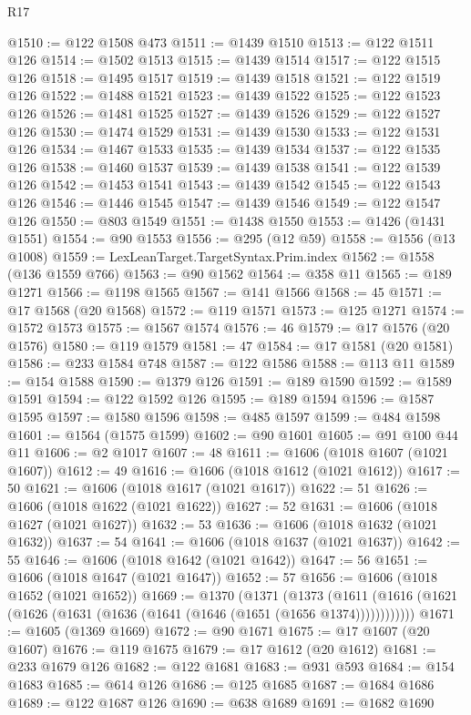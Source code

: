\begin{lexlean}{R17}
\begin{coremodule}
{{{{{{{{{{{{{{{{{{{{{{{{{{{{{{{{{{{{{{{{{{{{{{{{{{{{{{{{{{{{{{{{{{{{{{{{{{{{{{{{{{{{{{{{{{{{{{{{{{{{{{{{{{{@1510 := @122 @1508 @473
@1511 := @1439 @1510
@1513 := @122 @1511 @126
@1514 := @1502 @1513
@1515 := @1439 @1514
@1517 := @122 @1515 @126
@1518 := @1495 @1517
@1519 := @1439 @1518
@1521 := @122 @1519 @126
@1522 := @1488 @1521
@1523 := @1439 @1522
@1525 := @122 @1523 @126
@1526 := @1481 @1525
@1527 := @1439 @1526
@1529 := @122 @1527 @126
@1530 := @1474 @1529
@1531 := @1439 @1530
@1533 := @122 @1531 @126
@1534 := @1467 @1533
@1535 := @1439 @1534
@1537 := @122 @1535 @126
@1538 := @1460 @1537
@1539 := @1439 @1538
@1541 := @122 @1539 @126
@1542 := @1453 @1541
@1543 := @1439 @1542
@1545 := @122 @1543 @126
@1546 := @1446 @1545
@1547 := @1439 @1546
@1549 := @122 @1547 @126
@1550 := @803 @1549
@1551 := @1438 @1550
@1553 := @1426 (@1431 @1551)
@1554 := @90 @1553
@1556 := @295 (@12 @59)
@1558 := @1556 (@13 @1008)
@1559 := LexLeanTarget.TargetSyntax.Prim.index
@1562 := @1558 (@136 @1559 @766)
@1563 := @90 @1562
@1564 := @358 @11
@1565 := @189 @1271
@1566 := @1198 @1565
@1567 := @141 @1566
@1568 := 45
@1571 := @17 @1568 (@20 @1568)
@1572 := @119 @1571
@1573 := @125 @1271
@1574 := @1572 @1573
@1575 := @1567 @1574
@1576 := 46
@1579 := @17 @1576 (@20 @1576)
@1580 := @119 @1579
@1581 := 47
@1584 := @17 @1581 (@20 @1581)
@1586 := @233 @1584 @748
@1587 := @122 @1586
@1588 := @113 @11
@1589 := @154 @1588
@1590 := @1379 @126
@1591 := @189 @1590
@1592 := @1589 @1591
@1594 := @122 @1592 @126
@1595 := @189 @1594
@1596 := @1587 @1595
@1597 := @1580 @1596
@1598 := @485 @1597
@1599 := @484 @1598
@1601 := @1564 (@1575 @1599)
@1602 := @90 @1601
@1605 := @91 @100 @44 @11
@1606 := @2 @1017
@1607 := 48
@1611 := @1606 (@1018 @1607 (@1021 @1607))
@1612 := 49
@1616 := @1606 (@1018 @1612 (@1021 @1612))
@1617 := 50
@1621 := @1606 (@1018 @1617 (@1021 @1617))
@1622 := 51
@1626 := @1606 (@1018 @1622 (@1021 @1622))
@1627 := 52
@1631 := @1606 (@1018 @1627 (@1021 @1627))
@1632 := 53
@1636 := @1606 (@1018 @1632 (@1021 @1632))
@1637 := 54
@1641 := @1606 (@1018 @1637 (@1021 @1637))
@1642 := 55
@1646 := @1606 (@1018 @1642 (@1021 @1642))
@1647 := 56
@1651 := @1606 (@1018 @1647 (@1021 @1647))
@1652 := 57
@1656 := @1606 (@1018 @1652 (@1021 @1652))
@1669 := @1370
    (@1371
      (@1373 (@1611 (@1616 (@1621 (@1626 (@1631 (@1636 (@1641 (@1646 (@1651 (@1656 @1374))))))))))))
@1671 := @1605 (@1369 @1669)
@1672 := @90 @1671
@1675 := @17 @1607 (@20 @1607)
@1676 := @119 @1675
@1679 := @17 @1612 (@20 @1612)
@1681 := @233 @1679 @126
@1682 := @122 @1681
@1683 := @931 @593
@1684 := @154 @1683
@1685 := @614 @126
@1686 := @125 @1685
@1687 := @1684 @1686
@1689 := @122 @1687 @126
@1690 := @638 @1689
@1691 := @1682 @1690
}}}}}}}}}}}}}}}}}}}}}}}}}}}}}}}}}}}}}}}}}}}}}}}}}}}}}}}}}}}}}}}}}}}}}}}}}}}}}}}}}}}}}}}}}}}}}}}}}}}}}}}}}}}
\end{coremodule}
\end{lexlean}
